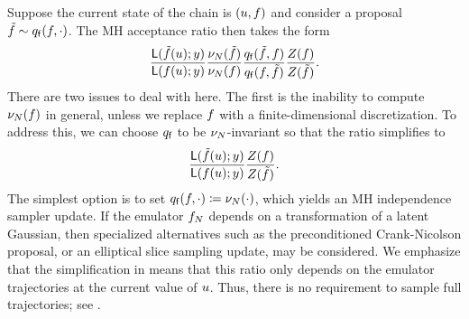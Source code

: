 \documentclass[12pt]{article}
\begin{document}
Suppose the current state of the chain is $(u, f)$ and consider a proposal
$\tilde{f} \sim q_{\mathsf{f}}(f, \cdot)$. The MH acceptance ratio then takes the form
\begin{align}
\frac{\mathsf{L}(\tilde{f}(u); y)}{\mathsf{L}(f(u); y)} \frac{\nu_{N}(\tilde{f})}{\nu_{N}(f)} 
\frac{q_{\mathsf{f}}(\tilde{f}, f)}{q_{\mathsf{f}}(f, \tilde{f})} \frac{Z(f)}{Z(\tilde{f})}.
\end{align}
There are two issues to deal with here. The first is the inability to compute $\nu_{N}(f)$ in general, 
unless we replace $f$ with a finite-dimensional discretization.
To address this, we can choose $q_{\mathsf{f}}$ to be $\nu_{N}$-invariant so that the ratio simplifies to
\begin{align}
\frac{\mathsf{L}(\tilde{f}(u); y)}{\mathsf{L}(f(u); y)} 
\frac{Z(f)}{Z(\tilde{f})}.
\label{eq:MH-ratio-prior-invariant}
\end{align}
The simplest option is to set $q_{\mathsf{f}}(f, \cdot) \coloneqq \nu_{N}(\cdot)$, which yields an MH independence
sampler update. If the emulator $f_{N}$ depends on a transformation of a latent Gaussian, then 
specialized alternatives such as the preconditioned Crank-Nicolson proposal, or an elliptical slice
sampling update, may be considered. We emphasize that the simplification in 
 means that this ratio only depends on the emulator trajectories at the current 
value of $u$. Thus, there is no requirement to sample full trajectories; see .
\end{document}
